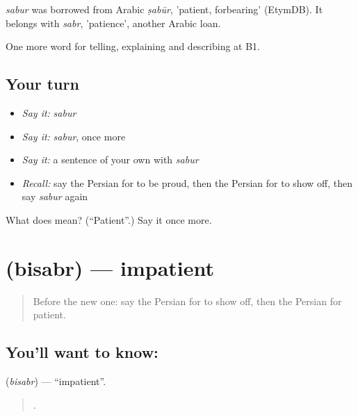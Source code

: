 \begin{cousinweb}
\emph{sabur} was borrowed from Arabic \emph{ṣabūr}, 'patient, forbearing' (EtymDB). It belongs with \emph{sabr}, 'patience', another Arabic loan.
\end{cousinweb}

\begin{grammarlens}[title={What you've built}]
One more word for telling, explaining and describing at B1.
\end{grammarlens}

\subsection*{Your turn}
\begin{itemize}
\raggedright
  \item \emph{Say it:} \emph{sabur}
  \item \emph{Say it:} \emph{sabur}, once more
  \item \emph{Say it:} a sentence of your own with \emph{sabur}
  \item \emph{Recall:} say the Persian for to be proud, then the Persian for to show off, then say \emph{sabur} again
\end{itemize}

\begin{tcolorbox}[breakable,colback=teal!4,colframe=teal!35!black,title={Before you move on}]
What does  mean? (\textquotedblleft{}Patient\textquotedblright{}.) Say it once more.
\end{tcolorbox}
\section[\texorpdfstring{\fa{بیصبر} (bisabr)}{بیصبر (bisabr)}]{ (bisabr) — impatient}

\label{lesson:FA-C481-bisabr}



\begin{quote}
Before the new one: say the Persian for to show off, then the Persian for patient.
\end{quote}

\subsection*{You'll want to know: }
\textbf{} (\emph{bisabr}) — \textquotedblleft{}impatient\textquotedblright{}.

\begin{quote}
        .
\end{quote}

